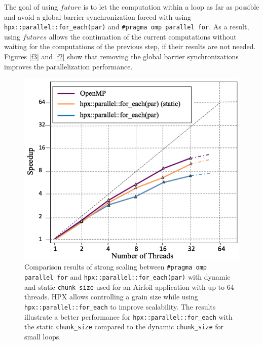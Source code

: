 \documentclass[conference]{IEEEtran}
\begin{document}
The goal of using $future$ is to let the computation within a loop as far as possible and avoid a global barrier synchronization forced with using  \texttt{hpx::parallel::for\_each(par)} and \texttt{\#pragma omp parallel for}. As a result, using $futures$ allows the continuation of the current computations without waiting for the computations of the previous step, if their results are not needed. Figures \ref{f3} and \ref{f2} show that removing the global barrier synchronizations improves the parallelization performance. 


\begin{figure} 
\begin{center}
\centering
\includegraphics[width=1\columnwidth]{Pictures/parallel_for_each.jpg}
\caption {\small{Comparison results of strong scaling between \texttt{\#pragma omp parallel for} and \texttt{hpx::parallel::for\_each(par)} with dynamic and static \texttt{chunk\_size} used for an Airfoil application
with up to 64 threads. HPX allows controlling a grain size while using \texttt{hpx::parallel::for\_each} to improve scalability. The results illustrate a better performance for \texttt{hpx::parallel::for\_each} with the static \texttt{chunk\_size} compared to the dynamic \texttt{chunk\_size} for small loops. }}
\label{f1}
\end{center}
\end{figure}
\end{document}
